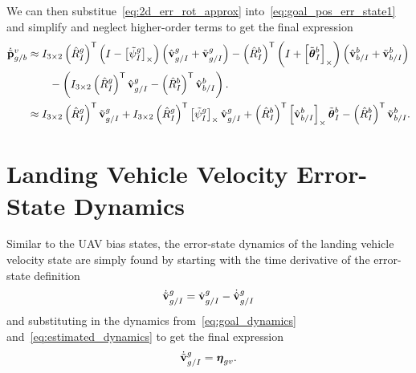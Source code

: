 We can then substitue~\eqref{eq:2d_err_rot_approx}
into~\eqref{eq:goal_pos_err_state1} and simplify and neglect higher-order terms
to get the final expression
\begin{align}
  \dot{\tilde{\boldsymbol{\mathrm{p}}}}_{g/b}^{v}
  &\approx
  \label{eq:goal_pos_err_state1}
  I_{3 \times 2} \left( \hat{R}_{I}^{g} \right)^{\mathsf{T}}
  \left( I - \left[ \tilde{\psi}_I^g \right]_{\times} \right)
  \left( \hat{\boldsymbol{\mathrm{v}}}_{g/I}^{g} + \tilde{\boldsymbol{\mathrm{v}}}_{g/I}^{g} \right)
  - \left( \hat{R}_{I}^{b} \right)^{\mathsf{T}}
  \left( I + \left[ \tilde{\boldsymbol{\mathrm{\theta}}}_I^b \right]_{\times} \right)
  \left( \hat{\boldsymbol{\mathrm{v}}}_{b/I}^{b} + \tilde{\boldsymbol{\mathrm{v}}}_{b/I}^{b} \right) \\
  & \qquad -
  \left(
  I_{3 \times 2} \left( \hat{R}_{I}^{g} \right)^{\mathsf{T}}
  \hat{\boldsymbol{\mathrm{v}}}_{g/I}^{g} - \left( \hat{R}_{I}^{b} \right)^{\mathsf{T}}
  \hat{\boldsymbol{\mathrm{v}}}_{b/I}^{b}
  \right). \nonumber \\
  &\approx
  \label{eq:goal_pos_err_state1}
  I_{3 \times 2} \left( \hat{R}_{I}^{g} \right)^{\mathsf{T}}
  \tilde{\boldsymbol{\mathrm{v}}}_{g/I}^g
  +
  I_{3 \times 2} \left( \hat{R}_{I}^{g} \right)^{\mathsf{T}}
  \left[  \tilde{\psi}_I^g  \right]_{\times} \hat{\boldsymbol{\mathrm{v}}}_{g/I}^g
  +
  \left( \hat{R}_{I}^{b} \right)^{\mathsf{T}} \left[  \hat{\boldsymbol{\mathrm{v}}}_{b/I}^{b}  \right]_{\times} 
  \tilde{\boldsymbol{\mathrm{\theta}}}_I^b
  -
  \left( \hat{R}_{I}^{b} \right)^{\mathsf{T}} \tilde{\boldsymbol{\mathrm{v}}}_{b/I}^{b} .
\end{align}

\section{Landing Vehicle Velocity Error-State Dynamics}
Similar to the UAV bias states, the error-state dynamics of the landing vehicle
velocity state are simply found by starting with the time derivative of the
error-state definition
\begin{equation}
  \dot{\tilde{\boldsymbol{\mathrm{v}}}}_{g/I}^g = \dot{\boldsymbol{\mathrm{v}}}_{g/I}^g -
  \dot{\hat{\boldsymbol{\mathrm{v}}}}_{g/I}^g
\end{equation}
and substituting in the dynamics from~\eqref{eq:goal_dynamics}
and~\eqref{eq:estimated_dynamics} to get the final expression
\begin{equation}
  \dot{\tilde{\boldsymbol{\mathrm{v}}}}_{g/I}^g = \boldsymbol{\mathrm{\eta}}_{gv}.
\end{equation}

